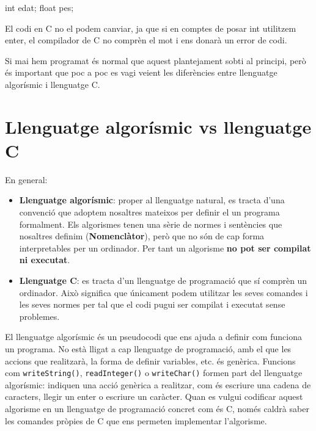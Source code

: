 \documentclass[]{book}
\newenvironment{Shaded}{\begin{snugshade}}{\end{snugshade}}
\newcommand{\DataTypeTok}[1]{\textcolor[rgb]{0.13,0.29,0.53}{#1}}
\newcommand{\NormalTok}[1]{#1}
\providecommand{\tightlist}{%
  \setlength{\itemsep}{0pt}\setlength{\parskip}{0pt}}
\begin{document}
\begin{Shaded}
\begin{Highlighting}[]
\DataTypeTok{int}\NormalTok{ edat;}
\DataTypeTok{float}\NormalTok{ pes;}
\end{Highlighting}
\end{Shaded}

El codi en C no el podem canviar, ja que si en comptes de posar int
utilitzem enter, el compilador de C no comprèn el mot i ens donarà un
error de codi.

Si mai hem programat és normal que aquest plantejament sobti al
principi, però és important que poc a poc es vagi veient les diferències
entre llenguatge algorísmic i llenguatge C.

\section{Llenguatge algorísmic vs llenguatge
C}\label{llenguatge-algorismic-vs-llenguatge-c}

En general:

\begin{itemize}
\tightlist
\item
  \textbf{Llenguatge algorísmic}: proper al llenguatge natural, es
  tracta d'una convenció que adoptem nosaltres mateixos per definir el
  un programa formalment. Els algorismes tenen una sèrie de normes i
  sentències que nosaltres definim (\textbf{Nomenclàtor}), però que no
  són de cap forma interpretables per un ordinador. Per tant un
  algorisme \textbf{no pot ser compilat ni executat}.
\item
  \textbf{Llenguatge C}: es tracta d'un llenguatge de programació que sí
  comprèn un ordinador. Això significa que únicament podem utilitzar les
  seves comandes i les seves normes per tal que el codi pugui ser
  compilat i executat sense problemes.
\end{itemize}

El llenguatge algorísmic és un pseudocodi que ens ajuda a definir com
funciona un programa. No està lligat a cap llenguatge de programació,
amb el que les accions que realitzarà, la forma de definir variables,
etc. és genèrica. Funcions com \texttt{writeString()},
\texttt{readInteger()} o \texttt{writeChar()} formen part del llenguatge
algorísmic: indiquen una acció genèrica a realitzar, com és escriure una
cadena de caracters, llegir un enter o escriure un caràcter. Quan es
vulgui codificar aquest algorisme en un llenguatge de programació
concret com és C, només caldrà saber les comandes pròpies de C que ens
permeten implementar l'algorisme.
\end{document}
